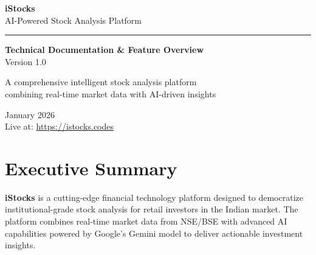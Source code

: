 \documentclass[11pt,a4paper]{article}
\begin{document}
\begin{titlepage}
    \centering
    \vspace*{2cm}
    
    
    \vspace{1cm}
    
    {\Huge\bfseries\textcolor{primary}{iStocks}}\\[0.5cm]
    {\Large\textcolor{textgray}{AI-Powered Stock Analysis Platform}}
    
    \vspace{2cm}
    
    \rule{0.6\textwidth}{1pt}
    
    \vspace{2cm}
    
    {\large\textbf{Technical Documentation \& Feature Overview}}\\[0.3cm]
    {\normalsize Version 1.0}
    
    \vspace{3cm}
    
    {\normalsize\textcolor{textgray}{A comprehensive intelligent stock analysis platform\\combining real-time market data with AI-driven insights}}
    
    \vfill
    
    {\small\textcolor{textgray}{January 2026}}\\[0.5cm]
    {\normalsize Live at: \textcolor{primary}{\url{https://istocks.codes}}}
    
\end{titlepage}

\tableofcontents
\newpage

\section{Executive Summary}

\textbf{iStocks} is a cutting-edge financial technology platform designed to democratize institutional-grade stock analysis for retail investors in the Indian market. The platform combines real-time market data from NSE/BSE with advanced AI capabilities powered by Google's Gemini model to deliver actionable investment insights.
\end{document}
